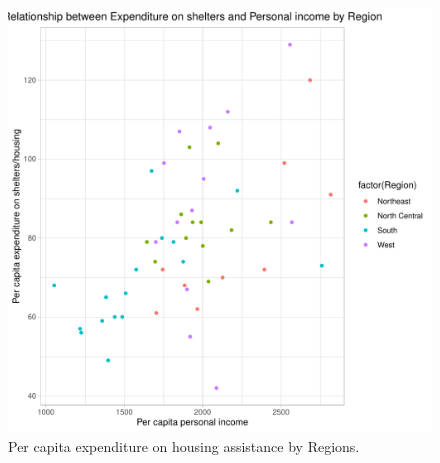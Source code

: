 \documentclass[12pt,letterpaper]{article}
\begin{document}
\begin{itemize}
\begin{figure}[hbtp!]\centering
	\caption{\footnotesize Per capita expenditure on housing assistance by Regions.}
	\label{boxplot}
	\includegraphics[width=.75\textwidth]{plot_3_variables.pdf}
\end{figure}

\end{itemize}
\end{document}
